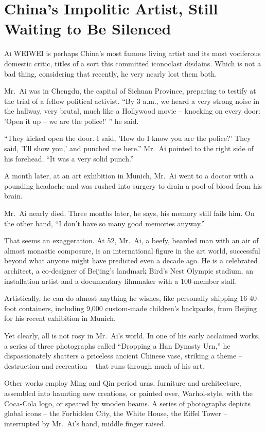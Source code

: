 ﻿\documentclass[12pt]{article}
\begin{document}
\section{China's Impolitic Artist, Still Waiting to Be Silenced}

\lettrine{A}{i} WEIWEI is perhaps China's most famous living artist and its
most vociferous domestic critic, titles of a sort this committed iconoclast disdains. Which is not a
bad thing, considering that recently, he very nearly lost them both.

Mr.~Ai was in Chengdu, the capital of Sichuan Province, preparing to testify at the trial of a
fellow political activist. ``By 3 a.m., we heard a very strong noise in the hallway, very brutal,
much like a Hollywood movie -- knocking on every door: 'Open it up -- we are the police!' '' he
said.

``They kicked open the door. I said, 'How do I know you are the police?' They said, 'I'll show you,'
and punched me here.'' Mr.~Ai pointed to the right side of his forehead. ``It was a very solid
punch.''

A month later, at an art exhibition in Munich, Mr.~Ai went to a doctor with a pounding headache and
was rushed into surgery to drain a pool of blood from his brain.

Mr.~Ai nearly died. Three months later, he says, his memory still fails him. On the other hand, ``I
don't have so many good memories anyway.''

That seems an exaggeration. At 52, Mr.~Ai, a beefy, bearded man with an air of almost monastic
composure, is an international figure in the art world, successful beyond what anyone might have
predicted even a decade ago. He is a celebrated architect, a co-designer of Beijing's landmark
Bird's Nest Olympic stadium, an installation artist and a documentary filmmaker with a 100-member
staff.

Artistically, he can do almost anything he wishes, like personally shipping 16 40-foot containers,
including 9,000 custom-made children's backpacks, from Beijing for his recent exhibition in Munich.

Yet clearly, all is not rosy in Mr.~Ai's world. In one of his early acclaimed works, a series of
three photographs called ``Dropping a Han Dynasty Urn,'' he dispassionately shatters a priceless
ancient Chinese vase, striking a theme -- destruction and recreation -- that runs through much of
his art.

Other works employ Ming and Qin period urns, furniture and architecture, assembled into haunting new
creations, or painted over, Warhol-style, with the Coca-Cola logo, or speared by wooden beams. A
series of photographs depicts global icons -- the Forbidden City, the White House, the Eiffel Tower
-- interrupted by Mr.~Ai's hand, middle finger raised.
\end{document}
